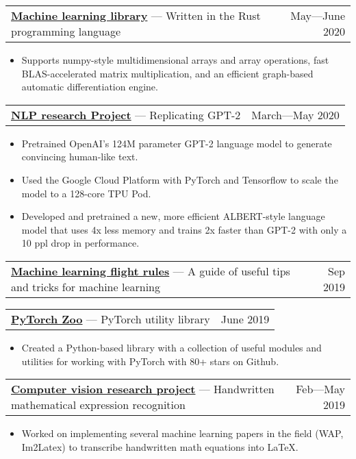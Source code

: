 \documentclass[letterpaper,11pt]{article}
\makeatletter
\newcommand{\heading}[3]{
    \begin{tabular*}{\textwidth}{l@{\extracolsep{\fill}}r}
        \textbf{#1} — #2 & #3
    \end{tabular*}
    \vspace{-1em}
}
\newcommand{\items}[1]{
    \begin{itemize}[topsep=0pt,leftmargin=1em]\itemsep0em
        #1
    \end{itemize}
}
\makeatother
\begin{document}
    \vspace{5pt}

    \heading{\href{https://github.com/bkkaggle/L2}{Machine learning library}}{Written in the Rust programming language}{May—June 2020}
    \items{
        \item Supports numpy-style multidimensional arrays and array operations, fast BLAS-accelerated matrix multiplication, and an efficient graph-based automatic differentiation engine.
    }
    
    \vspace{5pt}

    \heading{\href{https://github.com/bkkaggle/lm-training-research-project}{NLP research Project}}{Replicating GPT-2}{March—May 2020}
    \items{
        \item Pretrained OpenAI's 124M parameter GPT-2 language model to generate convincing human-like text.
        \item Used the Google Cloud Platform with PyTorch and Tensorflow to scale the model to a 128-core TPU Pod. 
        \item Developed and pretrained a new, more efficient ALBERT-style language model that uses 4x less memory and trains 2x faster than GPT-2 with only a 10 ppl drop in performance.
    }

    \vspace{5pt}

    \heading{\href{https://github.com/bkkaggle/machine-learning-flight-rules}{Machine learning flight rules}}{A guide of useful tips and tricks for machine learning}{Sep 2019}

    \vspace{5pt}

    \heading{\href{https://github.com/bkkaggle/pytorch_zoo}{PyTorch Zoo}}{PyTorch utility library}{June 2019}
    \items{
        \item Created a Python-based library with a collection of useful modules and utilities for working with PyTorch with 80+ stars on Github.
    }

    \vspace{5pt}

    \heading{\href{https://github.com/bkkaggle/math-recognition}{Computer vision research project}}{Handwritten mathematical expression recognition}{Feb—May 2019}
    \items{
        \item Worked on implementing several machine learning papers in the field (WAP, Im2Latex) to transcribe handwritten math equations into LaTeX.
    }
\end{document}
